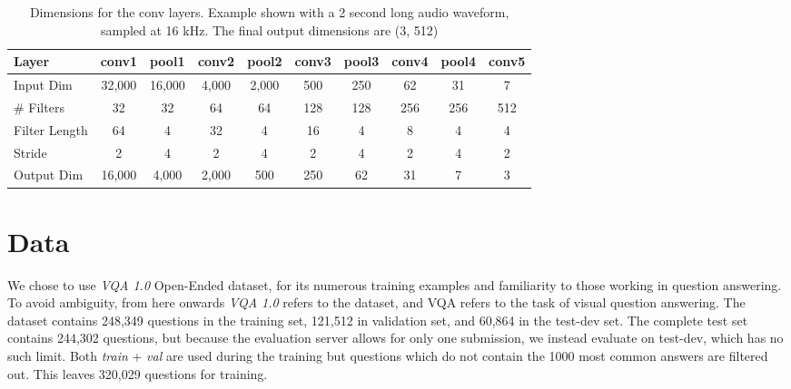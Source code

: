 \documentclass[letterpaper]{article} %
\begin{document}
\begin{table}[!ht]
\centering
\caption{Dimensions for the conv layers. Example shown with a 2 second long audio waveform, sampled at 16 kHz. The final output dimensions are (3, 512)}
\label{table:convdims}
\begin{tabular}{l|c|c|c|c|c|c|c|c|c}
Layer         & \multicolumn{1}{l|}{conv1} & \multicolumn{1}{l|}{pool1} & \multicolumn{1}{l|}{conv2} & \multicolumn{1}{l|}{pool2} & \multicolumn{1}{l|}{conv3} & \multicolumn{1}{l|}{pool3} & \multicolumn{1}{l|}{conv4} & \multicolumn{1}{l|}{pool4} & \multicolumn{1}{l}{conv5} \\ \hline
Input Dim     & 32,000                      & 16,000                      & 4,000                       & 2,000                       & 500                        & 250                        & 62                         & 31                         & 7                         \\
\# Filters    & 32                         & 32                         & 64                         & 64                         & 128                        & 128                        & 256                        & 256                        & 512                       \\
Filter Length & 64                         & 4                          & 32                         & 4                          & 16                         & 4                          & 8                          & 4                          & 4                         \\
Stride        & 2                          & 4                          & 2                          & 4                          & 2                          & 4                          & 2                          & 4                          & 2                         \\
Output Dim    & 16,000                      & 4,000                       & 2,000                       & 500                        & 250                        & 62                         & 31                         & 7                          & 3                        
\end{tabular}
\end{table}



\section{Data}
\label{sec:data}
We chose to use \textit{VQA 1.0} Open-Ended dataset, for its numerous training examples and familiarity to those working in question answering. To avoid ambiguity, from here onwards \textit{VQA 1.0} refers to the dataset, and VQA refers to the task of visual question answering. The dataset contains 248,349 questions in the training set, 121,512 in validation set, and 60,864 in the test-dev set. The complete test set contains 244,302 questions, but because the evaluation server allows for only one submission, we instead evaluate on test-dev, which has no such limit. Both \textit{train} + \textit{val} are used during the training but questions which do not contain the 1000 most common answers are filtered out. This leaves 320,029 questions for training.
\end{document}
